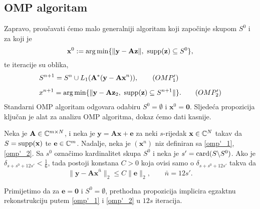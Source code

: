 \documentclass[a4paper,twoside,12pt]{memoir} %
\newcommand{\vect}[1]{\mathbf{#1}}
\renewcommand{\vec}{\vect}
\newcommand{\card}{\text{\normalfont{card}}}
\newcommand{\supp}{\text{\normalfont{supp}}}
\newcommand{\norm}[1]{\|{#1}\|}
\DeclareMathOperator*{\argmin}{arg\,min}
\begin{document}
\subsection[OMP algoritam][OMP algoritam]{OMP algoritam}
Zapravo, prou\v{c}avati \'cemo malo generalniji algoritam koji zapo\v{c}inje skupom $S^0$ i za koji je
\begin{equation}\label{6:40}
    \vec x^0 := \argmin\{\norm{\vec y - \vec{Az}},\ \supp(\vec z) \subseteq S^0\},
\end{equation}
te iteracije su oblika,
\begin{align}
    &S^{n+1} = S^n \cup L_1(\vec A^*(\vec y - \vec{Ax}^n)), \tag{$OMP'_1$}\label{omp'_1}\\[0.5em]
    &x^{n+1} = \argmin\{\norm{\vec y - \vec{Az}_2,\ \supp(\vec z) \subseteq S^{n+1}}\}. \tag{$OMP'_2$}\label{omp'_2}
\end{align}
Standarni OMP algoritam odgovara odabiru $S^0 = \emptyset$ i $\vec x^0 = \vec 0$. Sljede\'ca propozicija klju\v{c}an je alat za analizu OMP algoritma, dokaz \'cemo dati kasnije.
\begin{prop}\label{prop:6:24}
    Neka je $\vec A \in \C^{m \times N}$, i neka je $\vec y = \vec{Ax} + \vec e$ za neki $s$-rijedak $\vec x \in \C^N$ takav da $S = \supp(\vec x)$ te $\vec e \in \C^m$. Nadalje, neka je $(\vec x^n)$ niz definiran sa \eqref{omp'_1}, \eqref{omp'_2}. Sa $s^0$ ozna\v{c}imo kardinalitet skupa $S^0$ i neka je $s' = \card(S \backslash S^0)$. Ako je $\delta_{s+s^0+12s'} < \frac{1}{6}$, tada postoji konstana $C > 0$ koja ovisi samo o $\delta_{s+s^0+12s'}$ takva da
    \begin{equation*}
        \norm{\vec y - \vec{Ax}^{\bar n}}_2 \leq C \norm{\vec e}_2,\quad \quad \bar n = 12s'.
    \end{equation*}
\end{prop}
Primijetimo da za $\vec e = \vec 0$ i $S^0 = \emptyset$, prethodna propozicija implicira egzaktnu rekonstrukciju putem \eqref{omp'_1} i \eqref{omp'_2} u $12s$ iteracija. 
\end{document}
